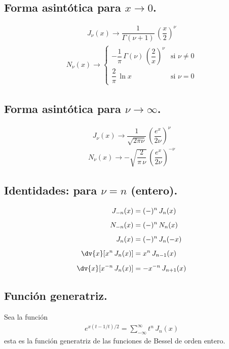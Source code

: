 \subsection{Forma asintótica para \texorpdfstring{$x \to 0$}{x -> 0}.}
\begin{align*}
J_{\nu} (x) \to \dfrac{1}{\Gamma (\nu + 1)} \, \left( \dfrac{x}{2} \right)^{\nu}
\end{align*}
\begin{align*}
N_{\nu} (x) \to 
\begin{cases}
- \dfrac{1}{\pi} \, \Gamma (\nu) \, \left( \dfrac{2}{x} \right)^{\nu} & \mbox{si } \nu \neq 0  \\[0.5em]
\dfrac{2}{\pi} \, \ln x & \mbox{si } \nu = 0 
\end{cases}
\end{align*}
\subsection{Forma asintótica para \texorpdfstring{$\nu \to \infty$}{nu to infty}.}
\begin{align*}
J_{\nu} (x) \to \dfrac{1}{\sqrt{2 \pi \nu}} \, \left( \dfrac{e^{x}}{2 \nu} \right)^{\nu}
\end{align*}
\begin{align*}
N_{\nu} (x) \to - \sqrt{\dfrac{2}{\pi \, \nu}} \, \left( \dfrac{e^{x}}{2 \nu} \right)^{- \nu}
\end{align*}
\subsection{Identidades: para \texorpdfstring{$\nu = n$}{nu = n} (entero).}
\begin{align*}
J_{-n} (x) &= (-)^{n} \, J_{n}(x) \\[0.5em]
N_{-n} (x) &= (-)^{n} \, N_{n}(x) \\[0.5em]
J_{n} (x) &= (-)^{n} \, J_{n}(-x) \\[0.5em]
\dv{x} [x^{n} \, J_{n}(x)] &=  x^{n} \, J_{n-1}(x) \\[0.5em]
\dv{x} [x^{-n} \, J_{n}(x)] &=  -x^{-n} \, J_{n+1}(x)
\end{align*}
\subsection{Función generatriz.}
Sea la función
\begin{align*}
e^{x(t-1/t)/2} = \sum_{-\infty}^{\infty} t^{n} \, J_{n} (x)
\end{align*}
esta es la función generatriz de las funciones de Bessel de orden entero.
